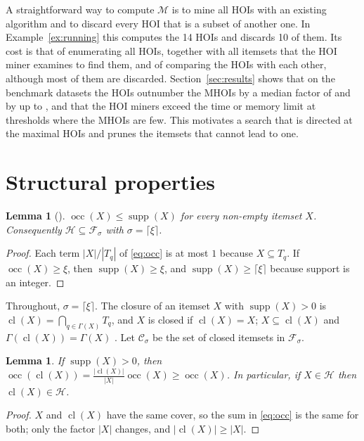 \documentclass[pdflatex,sn-mathphys,Numbered]{sn-jnl}
\theoremstyle{thmstyleone}
\newtheorem{lemma}[theorem]{Lemma}
\theoremstyle{thmstyletwo}
\theoremstyle{thmstylethree}
\newcommand{\supp}{\operatorname{supp}}
\newcommand{\occ}{\operatorname{occ}}
\newcommand{\cl}{\operatorname{cl}}
\newcommand{\HOI}{\mathcal{H}}
\newcommand{\MHOI}{\mathcal{M}}
\newcommand{\FI}{\mathcal{F}}
\newcommand{\FCI}{\mathcal{C}}
\begin{document}
A straightforward way to compute $\MHOI$ is to mine all HOIs with an existing algorithm \cite{deng2020hoi,nguyen2023dfhoi} and to discard every HOI that is a subset of another one. In Example~\ref{ex:running} this computes the 14 HOIs and discards 10 of them. Its cost is that of enumerating all HOIs, together with all itemsets that the HOI miner examines to find them, and of comparing the HOIs with each other, although most of them are discarded. Section~\ref{sec:results} shows that on the benchmark datasets the HOIs outnumber the MHOIs by a median factor of \MedianHoiMhoiRatio{} and by up to \MaxHoiMhoiMushroom{}, and that the HOI miners exceed the time or memory limit at thresholds where the MHOIs are few. This motivates a search that is directed at the maximal HOIs and prunes the itemsets that cannot lead to one.

\section{Structural properties}\label{sec:structure}

\begin{lemma}[{\cite[Theorem~1]{deng2020hoi}}]\label{lem:occsupp}
$\occ(X) \le \supp(X)$ for every non-empty itemset $X$. Consequently $\HOI \subseteq \FI_{\sigma}$ with $\sigma = \lceil \xi \rceil$.
\end{lemma}
\begin{proof}
Each term $|X|/|T_q|$ of \eqref{eq:occ} is at most $1$ because $X \subseteq T_q$. If $\occ(X) \ge \xi$, then $\supp(X) \ge \xi$, and $\supp(X) \ge \lceil \xi \rceil$ because support is an integer.
\end{proof}

Throughout, $\sigma = \lceil \xi \rceil$. The closure of an itemset $X$ with $\supp(X) > 0$ is $\cl(X) = \bigcap_{q \in \Gamma(X)} T_q$, and $X$ is closed if $\cl(X) = X$; $X \subseteq \cl(X)$ and $\Gamma(\cl(X)) = \Gamma(X)$ \cite{pasquier1999closed}. Let $\FCI_\sigma$ be the set of closed itemsets in $\FI_\sigma$.

\begin{lemma}\label{lem:closure}
If $\supp(X) > 0$, then $\occ(\cl(X)) = \frac{|\cl(X)|}{|X|} \occ(X) \ge \occ(X)$. In particular, if $X \in \HOI$ then $\cl(X) \in \HOI$.
\end{lemma}
\begin{proof}
$X$ and $\cl(X)$ have the same cover, so the sum in \eqref{eq:occ} is the same for both; only the factor $|X|$ changes, and $|\cl(X)| \ge |X|$.
\end{proof}
\end{document}
